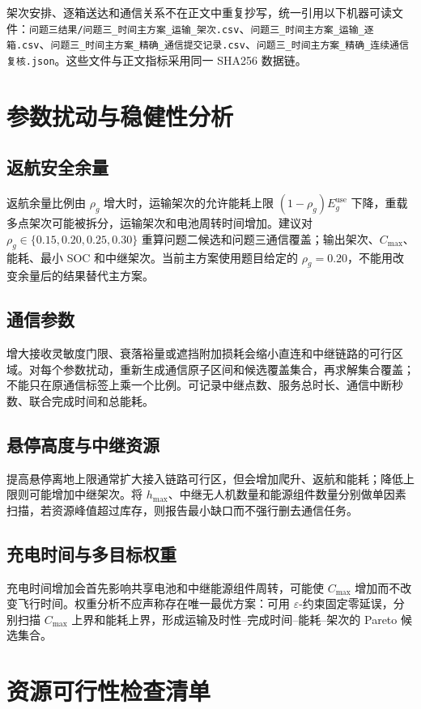 \documentclass[UTF8,a4paper,12pt]{ctexart}
\begin{document}
架次安排、逐箱送达和通信关系不在正文中重复抄写，统一引用以下机器可读文件：\texttt{问题三结果/问题三\_时间主方案\_运输\_架次.csv}、\texttt{问题三\_时间主方案\_运输\_逐箱.csv}、\texttt{问题三\_时间主方案\_精确\_通信提交记录.csv}、\texttt{问题三\_时间主方案\_精确\_连续通信复核.json}。这些文件与正文指标采用同一 SHA256 数据链。

\section{参数扰动与稳健性分析}

\subsection{返航安全余量}
返航余量比例由 $\rho_g$ 增大时，运输架次的允许能耗上限 $(1-\rho_g)E_g^{\mathrm{use}}$ 下降，重载多点架次可能被拆分，运输架次和电池周转时间增加。建议对 $\rho_g\in\{0.15,0.20,0.25,0.30\}$ 重算问题二候选和问题三通信覆盖；输出架次、$C_{\max}$、能耗、最小 SOC 和中继架次。当前主方案使用题目给定的 $\rho_g=0.20$，不能用改变余量后的结果替代主方案。

\subsection{通信参数}
增大接收灵敏度门限、衰落裕量或遮挡附加损耗会缩小直连和中继链路的可行区域。对每个参数扰动，重新生成通信原子区间和候选覆盖集合，再求解集合覆盖；不能只在原通信标签上乘一个比例。可记录中继点数、服务总时长、通信中断秒数、联合完成时间和总能耗。

\subsection{悬停高度与中继资源}
提高悬停离地上限通常扩大接入链路可行区，但会增加爬升、返航和能耗；降低上限则可能增加中继架次。将 $h_{\max}$、中继无人机数量和能源组件数量分别做单因素扫描，若资源峰值超过库存，则报告最小缺口而不强行删去通信任务。

\subsection{充电时间与多目标权重}
充电时间增加会首先影响共享电池和中继能源组件周转，可能使 $C_{\max}$ 增加而不改变飞行时间。权重分析不应声称存在唯一最优方案：可用 $\varepsilon$-约束固定零延误，分别扫描 $C_{\max}$ 上界和能耗上界，形成运输及时性--完成时间--能耗--架次的 Pareto 候选集合。

\section{资源可行性检查清单}
\end{document}
